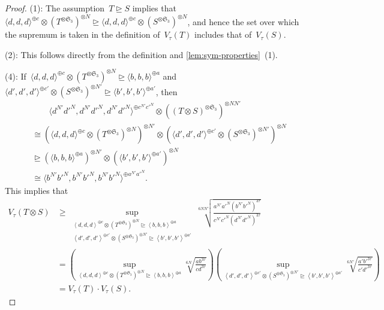\documentclass[11pt,letterpaper]{article}
\numberwithin{equation}{section}
\begin{document}
\begin{proof}
    (1): The assumption~$T\trianglerighteq S$ implies that~$\langle d, d, d\rangle^{\oplus c}\otimes(T^{\otimes\mathfrak{S}_3})^{\otimes N}\trianglerighteq\langle d, d, d\rangle^{\oplus c}\otimes(S^{\otimes\mathfrak{S}_3})^{\otimes N}$, and hence the set over which the supremum is taken in the definition of~$V_\tau(T)$ includes that of~$V_{\tau}(S)$.

    (2): This follows directly from the definition and \cref{lem:sym-properties}~(1).

    (4): If~$\langle d, d, d\rangle^{\oplus c}\otimes(T^{\otimes\mathfrak{S}_3})^{\otimes N}\trianglerighteq\langle b, b, b\rangle^{\oplus a}$ and $\langle d', d', d'\rangle^{\oplus c'}\otimes(S^{\otimes\mathfrak{S}_3})^{\otimes N'}\trianglerighteq\langle b', b', b'\rangle^{\oplus a'}$, then
    \begin{align*}
        &\qquad\langle d^{N'}d'^{N}, d^{N'}d'^{N}, d^{N'}d'^{N}\rangle^{\oplus c^{N'}c'^{N}}\otimes((T\otimes S)^{\otimes\mathfrak{S}_3})^{\otimes NN'}\\
        &\cong \left(\langle d, d, d\rangle^{\oplus c}\otimes(T^{\otimes \mathfrak{S}_3})^{\otimes N}\right)^{\otimes N'}\otimes\left(\langle d', d', d'\rangle^{\oplus c'}\otimes(S^{\otimes \mathfrak{S}_3})^{\otimes N'}\right)^{\otimes N}\\
        &\trianglerighteq \left(\langle b, b, b\rangle^{\oplus a}\right)^{\otimes N'}\otimes\left(\langle b', b', b'\rangle^{\oplus a'}\right)^{\otimes N}\\
        &\cong \langle b^{N'}b'^{N}, b^{N'}b'^{N}, b^{N'}b'^{N}\rangle^{\oplus a^{N'}a'^{N}}.
    \end{align*}
    This implies that
    \begin{align*}
        V_\tau(T\otimes S)
        &\ge \sup_{\substack{\left<d,d,d\right>^{\oplus c} \otimes (T^{\otimes \mathfrak{S}_3})^{\otimes N} \trianglerighteq \left<b,b,b\right>^{\oplus a}\\\left<d',d',d'\right>^{\oplus c'} \otimes (S^{\otimes \mathfrak{S}_3})^{\otimes N'} \trianglerighteq \left<b',b',b'\right>^{\oplus a'}}}\sqrt[6NN']{\frac{a^{N'}a'^{N}(b^{N'}b'^{N})^{3\tau}}{c^{N'}c'^{N}(d^{N'}d'^{N})^{3\tau}}}\\
        &= \left(\sup_{\left<d,d,d\right>^{\oplus c} \otimes (T^{\otimes \mathfrak{S}_3})^{\otimes N} \trianglerighteq \left<b,b,b\right>^{\oplus a}}\sqrt[6N]{\frac{ab^{3\tau}}{cd^{3\tau}}}\right)\left(\sup_{\left<d',d',d'\right>^{\oplus c'} \otimes (S^{\otimes \mathfrak{S}_3})^{\otimes N'} \trianglerighteq \left<b',b',b'\right>^{\oplus a'}}\sqrt[6N']{\frac{a'b'^{3\tau}}{c'd'^{3\tau}}}\right)\\
        &= V_\tau(T)\cdot V_\tau(S).
    \end{align*}


\end{proof}
\end{document}
